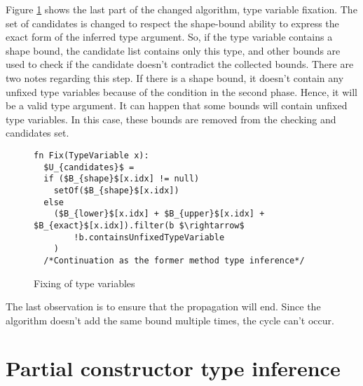 Figure \ref{img55::mainTypeInference3} shows the last part of the changed algorithm, type variable fixation. 
The set of candidates is changed to respect the shape-bound ability to express the exact form of the inferred type argument. 
So, if the type variable contains a shape bound, the candidate list contains only this type, and other bounds are used to check if the candidate doesn’t contradict the collected bounds. 
There are two notes regarding this step. 
If there is a shape bound, it doesn’t contain any unfixed type variables because of the condition in the second phase. 
Hence, it will be a valid type argument. It can happen that some bounds will contain unfixed type variables. 
In this case, these bounds are removed from the checking and candidates set.
\begin{figure}[h!]
\begin{lstlisting}[style=myAlgo, mathescape=true]
fn Fix(TypeVariable x):
  $U_{candidates}$ = 
  if ($B_{shape}$[x.idx] != null)
    setOf($B_{shape}$[x.idx])
  else
    ($B_{lower}$[x.idx] + $B_{upper}$[x.idx] + $B_{exact}$[x.idx]).filter(b $\rightarrow$
        !b.containsUnfixedTypeVariable
    )
  /*Continuation as the former method type inference*/
\end{lstlisting}
\caption{Fixing of type variables}
\label{img55::mainTypeInference3}
\end{figure}
\par
\begin{obs}
The last observation is to ensure that the propagation will end.
Since the algorithm doesn't add the same bound multiple times, the cycle can't occur.
\end{obs}

\section{Partial constructor type inference}


